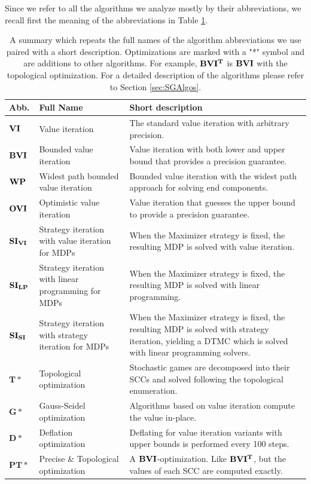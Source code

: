 Since we refer to all the algorithms we analyze mostly by their abbreviations, we recall first the meaning of the abbreviations in Table \ref{tab:recapAlgos}.
\begin{table}[h!]
    \centering
    \begin{tabular}{| p{0.1\linewidth} | p{0.3\linewidth} | p{0.6\linewidth} |}
        \hline
        Abb. & Full Name & Short description \\\hline
        $\mathbf{VI}$ & Value iteration & The standard value iteration with arbitrary precision.\\
        $\mathbf{BVI}$ & Bounded value iteration & Value iteration with both lower and upper bound that provides a precision guarantee.\\
        $\mathbf{WP}$ & Widest path bounded value iteration & Bounded value iteration with the widest path approach for solving end components.\\
        $\mathbf{OVI}$ & Optimistic value iteration & Value iteration that guesses the upper bound to provide a precision guarantee.\\
        $\mathbf{SI_{VI}}$ & Strategy iteration with value iteration for MDPs & When the Maximizer strategy is fixed, the resulting MDP is solved with value iteration.\\
        $\mathbf{SI_{LP}}$ & Strategy iteration with linear programming for MDPs & When the Maximizer strategy is fixed, the resulting MDP is solved with linear programming.\\
        $\mathbf{SI_{SI}}$ & Strategy iteration with strategy iteration for MDPs & When the Maximizer strategy is fixed, the resulting MDP is solved with strategy iteration, yielding a DTMC which is solved with linear programming solvers.\\
        $\mathbf{T}*$ & Topological optimization & Stochastic games are decomposed into their SCCs and solved following the topological enumeration.\\
        $\mathbf{G}*$ & Gauss-Seidel optimization & Algorithms based on value iteration compute the value in-place.\\
        $\mathbf{D}*$ & Deflation optimization & Deflating for value iteration variants with upper bounds is performed every 100 steps.\\
        $\mathbf{PT}*$ & Precise \& Topological optimization & A $\mathbf{BVI}$-optimization. Like $\mathbf{BVI^T}$, but the values of each SCC are computed exactly.\\
        \hline
    \end{tabular}
    \caption{A summary which repeats the full names of the algorithm abbreviations we use paired with a short description. 
    Optimizations are marked with a "*" symbol and are additions to other algorithms. For example, $\mathbf{BVI^T}$ is $\mathbf{BVI}$ with the topological optimization.
    For a detailed description of the algorithms please refer to Section \ref{sec:SGAlgos}.}
    \label{tab:recapAlgos}
\end{table}

